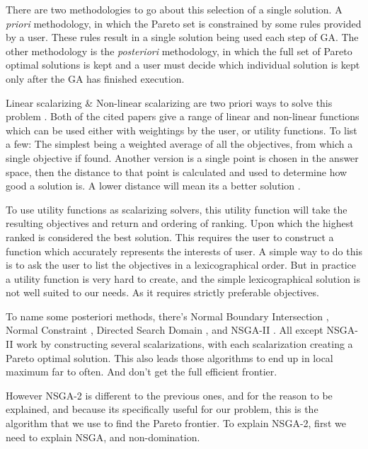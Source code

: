 \documentclass[11pt]{article}
\begin{document}
    There are two methodologies to go about this selection of a single solution. A \textit{priori}
    methodology, in which the Pareto set is constrained by some rules provided by a user.
    These rules result in a single solution being used each step of GA. The other
    methodology is the \textit{posteriori} methodology, in which
    the full set of Pareto optimal solutions is kept and a user must decide which individual
    solution is kept only after the GA has finished execution.

    Linear scalarizing \& Non-linear scalarizing are two priori ways to solve this problem
    \cite{KaisaMarko, Moffaert}. Both of the cited papers give a range of linear and non-linear
    functions which can be used either with weightings by the user, or utility functions.
    To list a few: The simplest being a weighted average of all the objectives, from
    which a single objective if found. Another version is a single point is chosen
    in the answer space, then the distance to that point is calculated and used to
    determine how good a solution is. A lower distance will mean its a better solution
    \cite{Buchanan}.

    To use utility functions as scalarizing solvers, this utility function will take
    the resulting objectives and return and ordering of ranking. Upon which the highest
    ranked is considered the best solution. This requires the user to construct
    a function which accurately represents the interests of user. A simple way
    to do this is to ask the user to list the objectives in a lexicographical order.
    But in practice a utility function is very hard to create, and the simple
    lexicographical solution is not well suited to our needs. As it requires
    strictly preferable objectives.

    To name some posteriori methods, there's Normal Boundary Intersection \cite{Indraneel},
    Normal Constraint \cite{Messac}, Directed Search Domain \cite{Tohid}, and NSGA-II
    \cite{DebPratapAgarwalMeyarivan}. All except NSGA-II work by constructing several
    scalarizations, with each scalarization creating a Pareto optimal solution.
    This also leads those algorithms to end up in local maximum far to often. And
    don't get the full efficient frontier.

    However NSGA-2 is different to the previous ones, and for the reason to be explained,
    and because its specifically useful for our problem, this is the algorithm that
    we use to find the Pareto frontier. To explain NSGA-2, first we need to explain
    NSGA, and non-domination.
\end{document}
